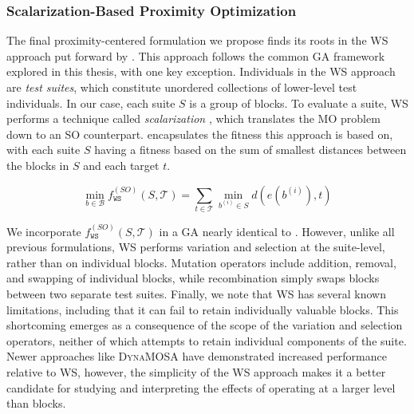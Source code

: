 \subsubsection{Scalarization-Based Proximity Optimization}


The final proximity-centered formulation we propose finds its roots
in the \gls{WS} approach put forward by \citet{fraser2012whole}.
This approach follows the common \gls{GA} framework explored in this
thesis, with one key exception.
Individuals in the \gls{WS} approach are \textit{test suites},
which constitute unordered collections of lower-level
test individuals.
In our case, each suite $S$ is a group of blocks.
To evaluate a suite, \gls{WS} performs a technique called
\textit{scalarization} \cite{deb2013multi}, which translates
the \gls{MO} problem down to an \gls{SO} counterpart.
 encapsulates the fitness this approach
is based on, with each suite $S$ having a fitness based on the sum
of smallest distances between the blocks in $S$ and each target $t$.

\begin{equation}
\min_{b \in \mathcal{B}} f^{(SO)}_{\texttt{WS}}(S, \mathcal{T}) = \sum_{t \in \mathcal{T}} \min_{b^{(i)} \in S} d(e(b^{(i)}), t)
\label{eq:proximity_ws}
\end{equation}

We incorporate $f^{(SO)}_{\texttt{WS}}(S, \mathcal{T})$ in a \gls{GA} nearly identical to
.
However, unlike all previous formulations, \gls{WS} performs variation and selection
at the suite-level, rather than on individual blocks.
Mutation operators include addition, removal, and swapping of individual blocks,
while recombination simply swaps blocks between two separate test suites.
Finally, we note that \gls{WS} has several known limitations, including that
it can fail to retain individually valuable blocks.
This shortcoming emerges as a consequence of the scope
of the variation and selection operators, neither of which
attempts to retain individual components of the suite.
Newer approaches like \textsc{DynaMOSA} have demonstrated increased performance
relative to \gls{WS}, however, the simplicity of the \gls{WS} approach
makes it a better candidate for studying and interpreting the effects of operating
at a larger level than blocks.

